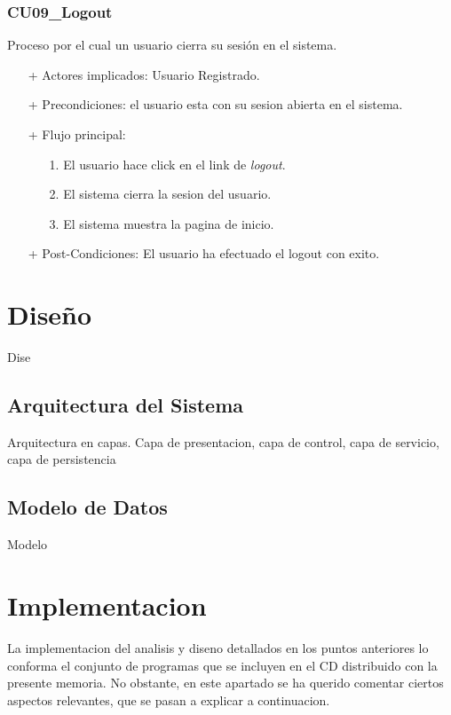 \documentclass[a4paper]{report}
\begin{document}
            \subsubsection{CU09\_Logout}
                Proceso por el cual un usuario cierra su sesi\'on en el sistema.
                \begin{itemize}
                    \item[+] Actores implicados: Usuario Registrado.
                    \item[+] Precondiciones: el usuario esta con su sesion abierta en el sistema.
                    \item[+] Flujo principal:
                    \begin{enumerate}
                        \item[1.] El usuario hace click en el link de \emph{logout}.
                        \item[2.] El sistema cierra la sesion del usuario.
                        \item[3.] El sistema muestra la pagina de inicio.
                    \end{enumerate}
                    \item[+] Post-Condiciones: El usuario ha efectuado el logout con exito.
                \end{itemize}


    \section{Diseño}
    Dise
    \subsection{Arquitectura del Sistema}
    Arquitectura en capas. Capa de presentacion, capa de control, capa de servicio, capa de persistencia
    \subsection{Modelo de Datos}
    Modelo

    \section{Implementacion}
    La implementacion del analisis y diseno detallados en los puntos anteriores lo conforma el conjunto de programas que se incluyen en el CD distribuido con la presente memoria.
    No obstante, en este apartado se ha querido comentar ciertos aspectos relevantes, que se pasan a explicar a continuacion.
\end{document}

